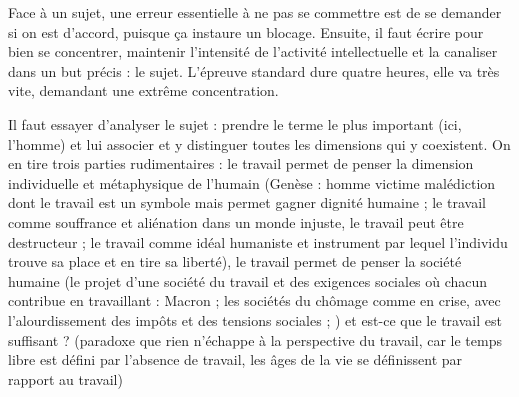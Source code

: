 \documentclass[a4paper,12pt]{book}
\begin{document}
Face à un sujet, une erreur essentielle à ne pas se commettre est de se demander si on est d'accord, puisque ça instaure un blocage. Ensuite, il faut écrire pour bien se concentrer, maintenir l'intensité de l'activité intellectuelle et la canaliser dans un but précis : le sujet. L'épreuve standard dure quatre heures, elle va très vite, demandant une extrême concentration.
\par Il faut essayer d'analyser le sujet : prendre le terme le plus important (ici, l'homme) et lui associer et y distinguer toutes les dimensions qui y coexistent. On en tire trois parties rudimentaires : le travail permet de penser la dimension individuelle et métaphysique de l'humain (Genèse : homme victime malédiction dont le travail est un symbole mais permet gagner dignité humaine ; le travail comme souffrance et aliénation dans un monde injuste, le travail peut être destructeur ; le travail comme idéal humaniste et instrument par lequel l'individu trouve sa place et en tire sa liberté), le travail permet de penser la société humaine (le projet d'une société du travail et des exigences sociales où chacun contribue en travaillant : Macron ; les sociétés du chômage comme en crise, avec l'alourdissement des impôts et des tensions sociales ; ) et est-ce que le travail est suffisant ? (paradoxe que rien n'échappe à la perspective du travail, car le temps libre est défini par l'absence de travail, les âges de la vie se définissent par rapport au travail)
\end{document}
